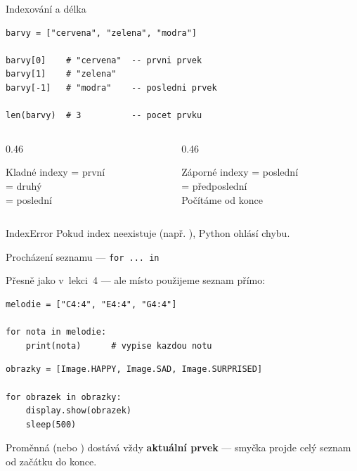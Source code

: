 \begin{frame}[fragile]{Indexování a délka}

  \begin{lstlisting}
barvy = ["cervena", "zelena", "modra"]

barvy[0]    # "cervena"  -- prvni prvek
barvy[1]    # "zelena"
barvy[-1]   # "modra"    -- posledni prvek

len(barvy)  # 3          -- pocet prvku
  \end{lstlisting}

  \bigskip
  \begin{columns}[T]
    \begin{column}{0.46\textwidth}
      \begin{block}{Kladné indexy}
        \pyinline{[0]} = první\\
        \pyinline{[1]} = druhý\\
        \pyinline{[n-1]} = poslední
      \end{block}
    \end{column}
    \begin{column}{0.46\textwidth}
      \begin{block}{Záporné indexy}
        \pyinline{[-1]} = poslední\\
        \pyinline{[-2]} = předposlední\\
        Počítáme od konce
      \end{block}
    \end{column}
  \end{columns}

  \pause\bigskip
  \begin{alertblock}{IndexError}
    Pokud index neexistuje (např. ), Python ohlásí chybu.
  \end{alertblock}
\end{frame}

\begin{frame}[fragile]{Procházení seznamu — \texttt{for ... in}}

  Přesně jako v~lekci~4 — ale místo  použijeme seznam přímo:

  \bigskip
  \begin{lstlisting}
melodie = ["C4:4", "E4:4", "G4:4"]

for nota in melodie:
    print(nota)      # vypise kazdou notu
  \end{lstlisting}

  \bigskip
  \begin{lstlisting}
obrazky = [Image.HAPPY, Image.SAD, Image.SURPRISED]

for obrazek in obrazky:
    display.show(obrazek)
    sleep(500)
  \end{lstlisting}

  \bigskip
  Proměnná  (nebo ) dostává vždy \textbf{aktuální prvek} —
  smyčka projde celý seznam od začátku do konce.
\end{frame}

